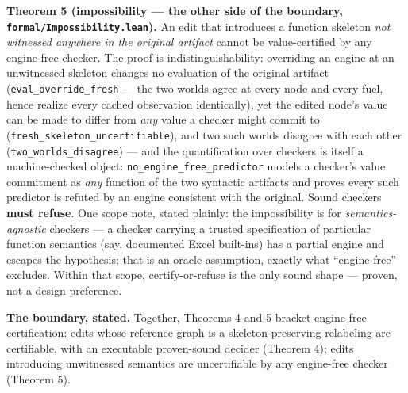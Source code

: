 \documentclass[
  11pt,
]{article}
\begin{document}
\textbf{Theorem 5 (impossibility --- the other side of the boundary,
\texttt{formal/Impossibility.lean}).} An edit that introduces a function
skeleton \emph{not witnessed anywhere in the original artifact} cannot
be value-certified by any engine-free checker. The proof is
indistinguishability: overriding an engine at an unwitnessed skeleton
changes no evaluation of the original artifact
(\texttt{eval\_override\_fresh} --- the two worlds agree at every node
and every fuel, hence realize every cached observation identically), yet
the edited node's value can be made to differ from \emph{any} value a
checker might commit to (\texttt{fresh\_skeleton\_uncertifiable}), and
two such worlds disagree with each other
(\texttt{two\_worlds\_disagree}) --- and the quantification over
checkers is itself a machine-checked object:
\texttt{no\_engine\_free\_predictor} models a checker's value commitment
as \emph{any} function of the two syntactic artifacts and proves every
such predictor is refuted by an engine consistent with the original.
Sound checkers \textbf{must refuse}. One scope note, stated plainly: the
impossibility is for \emph{semantics-agnostic} checkers --- a checker
carrying a trusted specification of particular function semantics (say,
documented Excel built-ins) has a partial engine and escapes the
hypothesis; that is an oracle assumption, exactly what ``engine-free''
excludes. Within that scope, certify-or-refuse is the only sound shape
--- proven, not a design preference.

\textbf{The boundary, stated.} Together, Theorems 4 and 5 bracket
engine-free certification: edits whose reference graph is a
skeleton-preserving relabeling are certifiable, with an executable
proven-sound decider (Theorem 4); edits introducing unwitnessed
semantics are uncertifiable by any engine-free checker (Theorem 5).
\end{document}
